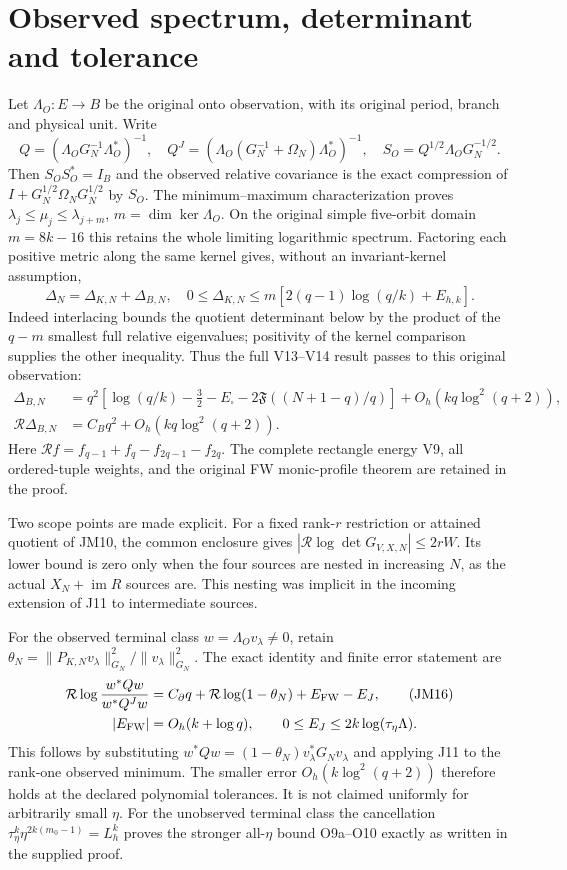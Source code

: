 \section{Observed spectrum, determinant and tolerance}
Let $\Lambda_O:E\to B$ be the original onto observation, with its
original period, branch and physical unit. Write
\[
 Q=(\Lambda_OG_N^{-1}\Lambda_O^*)^{-1},\quad
 Q^J=(\Lambda_O(G_N^{-1}+\Omega_N)\Lambda_O^*)^{-1},\quad
 S_O=Q^{1/2}\Lambda_OG_N^{-1/2}.\tag{JM12}
\]
Then $S_OS_O^*=I_B$ and the observed relative covariance is the exact
compression of $I+G_N^{1/2}\Omega_NG_N^{1/2}$ by $S_O$.
The minimum--maximum characterization proves
$\lambda_j\le\mu_j\le\lambda_{j+m}$, $m=\dim\ker\Lambda_O$.
On the original simple five-orbit domain $m=8k-16$ this retains the
whole limiting logarithmic spectrum. Factoring each positive metric
along the same kernel gives, without an invariant-kernel assumption,
\[
 \Delta_N=\Delta_{K,N}+\Delta_{B,N},\quad
 0\le\Delta_{K,N}\le m[2(q-1)\log(q/k)+E_{h,k}].\tag{JM13}
\]
Indeed interlacing bounds the quotient determinant below by the
product of the $q-m$ smallest full relative eigenvalues; positivity
of the kernel comparison supplies the other inequality.
Thus the full V13--V14 result passes to this original observation:
\begin{align}
 \Delta_{B,N}&=q^2\left[\log(q/k)-\tfrac32-E_\square
 -2\mathfrak F((N+1-q)/q)\right]+O_h(kq\log^2(q+2)),\tag{JM14}\\
 \mathcal R\Delta_{B,N}&=C_Bq^2+O_h(kq\log^2(q+2)).\tag{JM15}
\end{align}
Here $\mathcal R f=f_{q-1}+f_q-f_{2q-1}-f_{2q}$.
The complete rectangle energy V9, all ordered-tuple weights,
and the original FW monic-profile theorem are retained in the proof.

Two scope points are made explicit. For a fixed rank-$r$ restriction
or attained quotient of JM10, the common enclosure gives
$|\mathcal R\log\det G_{V,X,N}|\le2rW$. Its lower bound is zero only
when the four sources are nested in increasing $N$, as the actual
$X_N+\operatorname{im}R$ sources are. This nesting was implicit in
the incoming extension of J11 to intermediate sources.

For the observed terminal class $w=\Lambda_Ov_\lambda\ne0$, retain
$\theta_N=\|P_{K,N}v_\lambda\|_{G_N}^2/\|v_\lambda\|_{G_N}^2$.
The exact identity and finite error statement are
\begin{align}
 \mathcal R\log\frac{w^*Qw}{w^*Q^Jw}
 &=C_\partial q+\mathcal R\log(1-\theta_N)
   +E_{\rm FW}-E_J,\tag{JM16}\\
 |E_{\rm FW}|&=O_h(k+\log q),\qquad
 0\le E_J\le2k\log(\tau_\eta\Lambda).\notag
\end{align}
This follows by substituting
$w^*Qw=(1-\theta_N)v_\lambda^*G_Nv_\lambda$ and applying J11 to
the rank-one observed minimum. The smaller error
$O_h(k\log^2(q+2))$ therefore holds at the declared polynomial
tolerances. It is not claimed uniformly for arbitrarily small $\eta$.
For the unobserved terminal class the cancellation
$\tau_\eta^k\eta^{2k(m_0-1)}=L_h^k$ proves the stronger
all-$\eta$ bound O9a--O10 exactly as written in the supplied proof.

